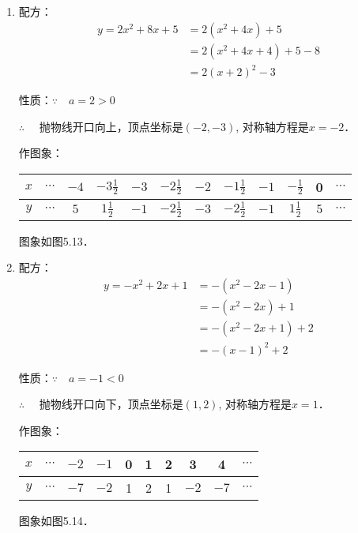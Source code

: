 \begin{solution}
\begin{enumerate}
    \item 配方：
\[\begin{split}
    y=2x^2+8x+5&=2(x^2+4x)+5\\
    &=2(x^2+4x+4)+5-8\\
    &=2(x+2)^2-3
\end{split}\]

性质：$\because\quad a=2>0$

$\therefore\quad $
抛物线开口向上，顶点坐标是$(-2,-3)$, 对称轴方程是$x=-2$．

作图象：
\begin{center}
\begin{tabular}{c|ccccccccccc}
\hline
$x$&$\cdots$& $-4$ &  $-3\tfrac{1}{2}$ & $-3$ &  $-2\tfrac{1}{2}$ & $-2$ &  $-1\tfrac{1}{2}$ &  $-1$ &  $-\tfrac{1}{2}$ &  0 &$\cdots$\\
\hline
$y$&$\cdots$ & $5$& $1\tfrac{1}{2}$ &  $-1$ &  $-2\tfrac{1}{2}$ &  $-3$ &  $-2\tfrac{1}{2}$ &  $-1$ &  $1\tfrac{1}{2}$ &  $5$ &  $\cdots$ \\
\hline
\end{tabular}
\end{center}  
图象如图5.13．

\item 配方：
\[\begin{split}
    y=-x^2+2x+1&=-(x^2-2x-1)\\
    &=-(x^2-2x)+1\\
    &=-(x^2-2x+1)+2\\
&=-(x-1)^2+2
\end{split}\]

性质：$\because\quad a=-1<0$

$\therefore\quad $
抛物线开口向下，顶点坐标是$(1,2)$, 对称轴方程是$x=1$．

作图象：
\begin{center}
\begin{tabular}{c|ccccccccc}
\hline
$x$&$\cdots$& $-2$ &  $-1$ & 0 & 1 & 2 &  3 &  4 &$\cdots$\\
\hline
$y$&$\cdots$ & $-7$& $-2$ &  1 & 2 & 1 &  $-2$ &  $-7$  &  $\cdots$ \\
\hline
\end{tabular}
\end{center}  
图象如图5.14．


\end{enumerate}
\end{solution}
